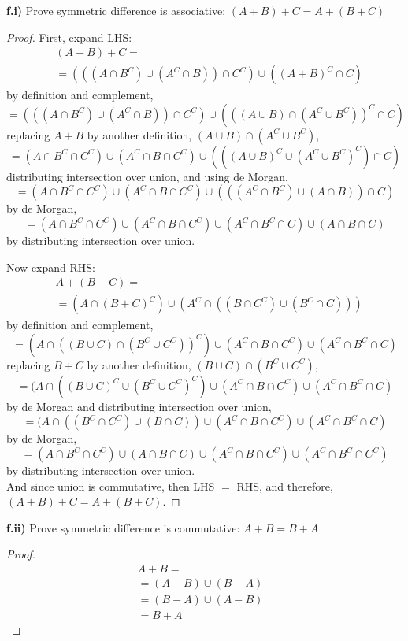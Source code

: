 \documentclass[titlepage, letterpaper, fleqn]{article}
\newcommand{\spacepls}{\vspace{5mm}}
\begin{document}
\spacepls

{\large \textbf{f.i)} Prove symmetric difference is associative: \((A + B) + C = A + (B + C)\)}

\begin{proof}
First, expand LHS:
\begin{align*}
	& (A + B) + C =
	\\ &= (((A \cap B^C) \cup (A^C \cap B))\cap C^C) \cup ((A + B)^C \cap C)
\end{align*}
by definition and complement,
\[= (((A \cap B^C) \cup (A^C \cap B))\cap C^C) \cup (((A \cup B) \cap (A^C \cup B^C))^C \cap C)\]
replacing \(A + B\) by another definition, \((A \cup B) \cap (A^C \cup B^C)\),
\[= (A \cap B^C \cap C^C) \cup (A^C \cap B \cap C^C) \cup (((A \cup B)^C\cup (A^C \cup B^C)^C) \cap C)\]
distributing intersection over union, and using de Morgan,
\[= (A \cap B^C \cap C^C) \cup (A^C \cap B \cap C^C) \cup (((A^C \cap B^C) \cup (A \cap B))\cap C)\]
by de Morgan,
\[= (A \cap B^C \cap C^C) \cup (A^C \cap B \cap C^C) \cup (A^C \cap B^C \cap C) \cup (A \cap B \cap C)\]
by distributing intersection over union.

\spacepls

Now expand RHS:
\begin{align*}
	& A + (B + C) =
	\\ &= (A \cap (B + C)^C) \cup (A^C \cap ((B \cap C^C) \cup (B^C \cap C)))
\end{align*}
by definition and complement,
\[= (A \cap ((B \cup C) \cap (B^C \cup C^C))^C) \cup (A^C \cap B \cap C^C) \cup (A^C \cap B^C \cap C)\]
replacing \(B + C\) by another definition, \((B \cup C) \cap (B^C \cup C^C)\), 
\[= (A \cap ((B \cup C)^C \cup (B^C \cup C^C)^C) \cup (A^C \cap B \cap C^C) \cup (A^C \cap B^C \cap C)\]
by de Morgan and distributing intersection over union,
\[= (A \cap ((B^C \cap C^C) \cup (B \cap C)) \cup (A^C \cap B \cap C^C) \cup (A^C \cap B^C \cap C)\]
by de Morgan,
\[= (A \cap B^C \cap C^C) \cup (A \cap B \cap C) \cup (A^C \cap B \cap C^C) \cup (A^C \cap B^C \cap C^C)\]
by distributing intersection over union.\\
And since union is commutative, then LHS \(=\) RHS, and therefore, \((A + B) + C = A + (B + C)\).
\end{proof}

\spacepls

{\large \textbf{f.ii)} Prove symmetric difference is commutative: \(A + B = B + A\)}

\begin{proof}
\begin{align*}
	& A + B =
	\\ &= (A - B) \cup (B - A)	&&\tag*{by definition}
	\\ &= (B - A) \cup (A - B) 	&&\tag*{by union commutativity}
	\\ &= B + A	&&\tag*{by definition}
\end{align*}
\end{proof}
\end{document}
